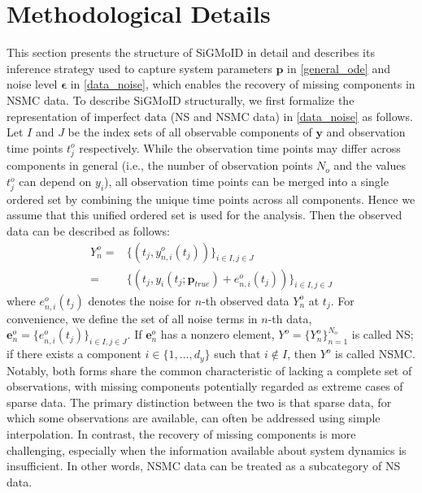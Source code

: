 \documentclass[letterpaper]{article} %
\theoremstyle{thmstyleone}%
\theoremstyle{thmstyletwo}%
\theoremstyle{thmstylethree}%
\begin{document}
\newpage


\newpage
\appendix
\onecolumn

\renewcommand{\thetable}{A\arabic{table}}
\renewcommand{\thefigure}{A\arabic{figure}}
\setcounter{table}{0}
\setcounter{figure}{0}

\section{Methodological Details}\label{method_detail}
This section presents the structure of SiGMoID in detail and describes its inference strategy used to capture system parameters $\mathbf{p}$ in \cref{general_ode} and noise level $\mathbf{\epsilon}$ in \cref{data_noise}, which enables the recovery of missing components in NSMC data. To describe SiGMoID structurally, we first formalize the representation of imperfect data (NS and NSMC data) in \cref{data_noise} as follows. Let $I$ and $J$ be the index sets of all observable components of $\mathbf{y}$ and observation time points $t^{o}_{j}$ respectively. While the observation time points may differ across components in general (i.e., the number of observation points $N_{o}$ and the values $t_{j}^{o}$ can depend on $y_{i}$), all observation time points can be merged into a single ordered set by combining the unique time points across all components. Hence we assume that this unified ordered set is used for the analysis. Then the observed data can be described as follows:
\begin{eqnarray}\label{data_noise_math}
    Y_{n}^{o}=& \{(t_{j},y_{n,i}^{o}(t_{j}))\}_{i \in I, j \in J} \nonumber\\
    =& \{(t_{j}, y_{i}(t_{j};\mathbf{p}_{true})+e_{n,i}^{o}(t_{j}))\}_{i \in I, j \in J}
\end{eqnarray}
where $e_{n,i}^{o}(t_{j})$ denotes the noise for $n$-th observed data $Y_{n}^{o}$ at $t_{j}$. For convenience, we define the set of all noise terms in $n$-th data, $\mathbf{e}_{n}^{o}=\{e_{n,i}^{o}(t_{j})\}_{i\in I, j\in J}$. If $\mathbf{e}_{n}^{o}$ has a nonzero element, $Y^{o}=\{Y_{n}^{o}\}_{n=1}^{N_{o}}$ is called NS; if there exists a component $i \in \{1,\dots,d_{y}\}$ such that $i\notin I$, then $Y^{o}$ is called NSMC. Notably, both forms share the common characteristic of lacking a complete set of observations, with missing components potentially regarded as extreme cases of sparse data. The primary distinction between the two is that sparse data, for which some observations are available, can often be addressed using simple interpolation. In contrast, the recovery of missing components is more challenging, especially when the information available about system dynamics is insufficient. In other words, NSMC data can be treated as a subcategory of NS data.
\end{document}
